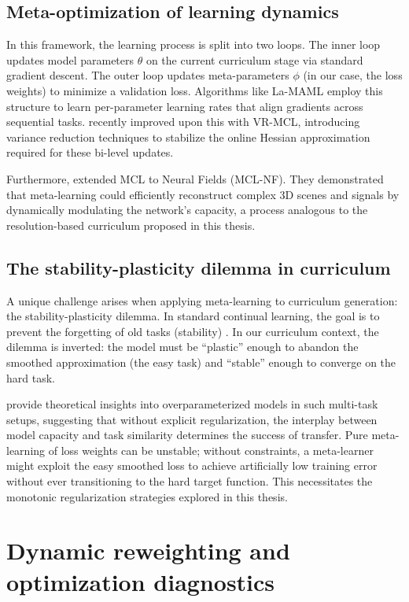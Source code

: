 \documentclass[english,master,a4paper,oneside]{ppfcmthesis}
\begin{document}
\subsection{Meta-optimization of learning dynamics}
In this framework, the learning process is split into two loops. The inner loop
updates model parameters $\theta$ on the current curriculum stage via standard
gradient descent. The outer loop updates meta-parameters $\phi$ (in our case,
the loss weights) to minimize a validation loss. Algorithms like
La-MAML \citep{gupta2020lamaml} employ this structure to learn
per-parameter learning rates that align gradients across sequential tasks.
\citet{wu2024meta} recently improved upon this with VR-MCL, introducing
variance reduction techniques to stabilize the online Hessian approximation
required for these bi-level updates.

Furthermore, \citet{woo2025meta} extended MCL to Neural Fields
(MCL-NF). They demonstrated that meta-learning could efficiently reconstruct
complex 3D scenes and signals by dynamically modulating the network's capacity,
a process analogous to the resolution-based curriculum proposed in this thesis.

\subsection{The stability-plasticity dilemma in curriculum}
A unique challenge arises when applying meta-learning to curriculum generation:
the stability-plasticity dilemma. In standard continual learning, the goal is
to prevent the forgetting of old tasks (stability) \citep{parisi2019continual}.
In our curriculum context, the dilemma is inverted: the model must be
``plastic'' enough to abandon the smoothed approximation (the easy task) and
``stable'' enough to converge on the hard task.

\citet{banayeeanzade2025theoretical} provide theoretical insights into overparameterized models in such multi-task setups, suggesting that without explicit regularization, the interplay between model capacity and task similarity determines the success of transfer. Pure meta-learning of loss weights can be unstable; without constraints, a meta-learner might exploit the easy smoothed loss to achieve artificially low training error without ever transitioning to the hard target function. This necessitates the monotonic regularization strategies explored in this thesis.

\section{Dynamic reweighting and optimization diagnostics}
\end{document}
